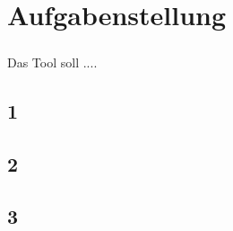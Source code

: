 
\chapter{Aufgabenstellung}\label{chp:aufgabenstellung}
\paragraph{}
Das Tool soll ....

\section{1}
\paragraph{}



\section{2}
\paragraph{}


\section{3}
\paragraph{}
